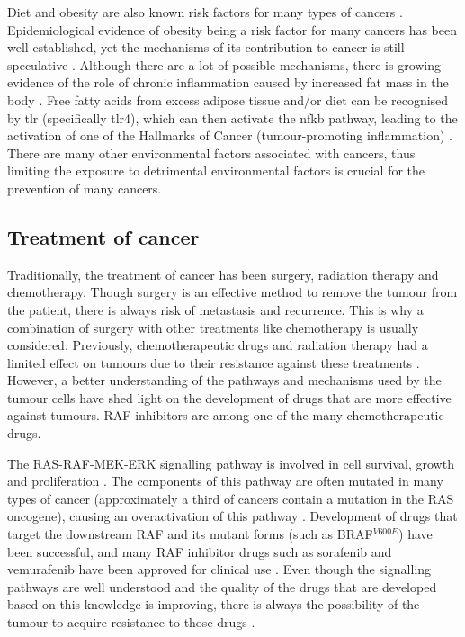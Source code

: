 Diet and obesity are also known risk factors for many types of cancers \citep{Ames1995,Calle2004}.
Epidemiological evidence of obesity being a risk factor for many cancers has been well established, yet the mechanisms of its contribution to cancer is still  speculative \citep{Calle2003,Kelesidis2006}.
Although there are a lot of possible mechanisms, there is growing evidence of the role of chronic inflammation caused by increased fat mass in the body \citep{Kelesidis2006,Lumeng2011,Hernandez2013}.
Free fatty acids from excess adipose tissue and/or diet can be recognised by \gls{tlr} (specifically \gls{tlr}4), which can then activate the \gls{nfkb} pathway, leading to the activation of one of the Hallmarks of Cancer (tumour-promoting inflammation) \citep{Lumeng2011}.
There are many other environmental factors associated with cancers, thus limiting the exposure to detrimental environmental factors is crucial for the prevention of many cancers.

\subsection{Treatment of cancer}
\label{sub:treatment_of_cancer}

Traditionally, the treatment of cancer has been surgery, radiation therapy and chemotherapy.
Though surgery is an effective method to remove the tumour from the patient, there is always risk of metastasis and recurrence.
This is why a combination of surgery with other treatments like chemotherapy is usually considered.
Previously, chemotherapeutic drugs and radiation therapy had a limited effect on tumours due to their resistance against these treatments \citep{Wilhelm2006}.
However, a better understanding of the pathways and mechanisms used by the tumour cells have shed  light on the development of drugs that are more effective against tumours.
RAF inhibitors are among one of the many chemotherapeutic drugs.

The RAS-RAF-MEK-ERK signalling pathway is  involved in cell survival, growth and proliferation \citep{Samatar2014,Wilhelm2006}.
The components of this pathway are often mutated in many types of cancer (approximately a third of cancers contain a mutation in the RAS oncogene), causing an overactivation of this pathway \citep{Samatar2014}.
Development of drugs that target  the downstream RAF and its mutant forms (such as BRAF$^{V600E}$) have been successful, and many RAF inhibitor drugs such as sorafenib and vemurafenib have been approved for clinical use \citep{Samatar2014,Wilhelm2006}.
Even though the signalling pathways are well understood and the quality of the drugs that are developed based on this knowledge is improving, there is always the possibility of the tumour to acquire resistance to those drugs \citep{Samatar2014}.

